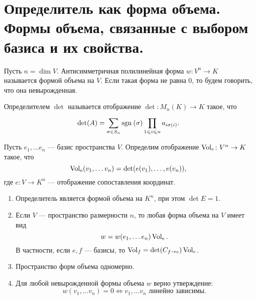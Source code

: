 % 
% 
\section{Определитель как форма объема. Формы объема, связанные с выбором базиса и их свойства.}
\begin{defn}
    Пусть $ n = \dim V$. Антисимметричная полилинейная форма  $ w \colon  V^{n} \to K$   называется {\sf формой объема} на $ V$. Если такая форма не равна 0, то будем говорить, что она  {\sf невырожденная}.   
\end{defn}
\begin{defn}[Определитель]
    {\sf Определителем $ \det$} называется отображение $ \det \colon M_n(K) \to  K$ такое, что
    \[
	\det (A) = \sum_{\sigma \in S_{n} }^{}{\mathop{\text{\rm sgn}}}\:(\sigma ) \prod_{1 \leqslant i \leqslant n} a_{i\sigma (i)}
    .\] 
\end{defn}
\begin{defn}
    Пусть $ e_1, \ldots e_n$ --- базис пространства $ V$. Определим отображение  $ \operatorname{Vol}_e\colon V^{n} \to  K$ такое, что 
    \[
	\operatorname{Vol}_e (v_1, \ldots v_n) = \det(e(v_1), \ldots , e(v_n))
    ,\] 
    где $ e\colon V \to  K^{n}$ --- отображение сопоставления координат.
\end{defn}

\begin{thm}
    \begin{enumerate}[noitemsep]
        \item Определитель является формой объема на $ K^{n}$, при этом $ \det E = 1$.
	\item Если  $ V$ --- пространство размерности  $ n$, то любая форма объема на  $ V$ имеет вид 
	     \[
		 w = w(e_1, \ldots e_n)\operatorname{Vol}_e
	    .\] 
	    В частности, если $ e, f$ --- базисы, то  $ \operatorname{Vol}_f = \det(C_{f \to  e}) \operatorname{Vol}_e$.
	\item Пространство форм объема одномерно.
	\item Для любой невырожденной формы объема $ w$ верно утверждение:
	     \[
		 w(v_1, \ldots v_n) = 0 \Longleftrightarrow v_1, \ldots v_n \text{ линейно зависимы}
	    .\] 
    \end{enumerate} 
\end{thm}
% 

